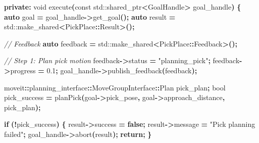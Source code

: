 \documentclass[
]{article}
\newenvironment{Shaded}{\begin{snugshade}}{\end{snugshade}}
\newcommand{\AttributeTok}[1]{\textcolor[rgb]{0.13,0.29,0.53}{#1}}
\newcommand{\BuiltInTok}[1]{#1}
\newcommand{\CommentTok}[1]{\textcolor[rgb]{0.56,0.35,0.01}{\textit{#1}}}
\newcommand{\ControlFlowTok}[1]{\textcolor[rgb]{0.13,0.29,0.53}{\textbf{#1}}}
\newcommand{\DataTypeTok}[1]{\textcolor[rgb]{0.13,0.29,0.53}{#1}}
\newcommand{\FloatTok}[1]{\textcolor[rgb]{0.00,0.00,0.81}{#1}}
\newcommand{\KeywordTok}[1]{\textcolor[rgb]{0.13,0.29,0.53}{\textbf{#1}}}
\newcommand{\NormalTok}[1]{#1}
\newcommand{\OperatorTok}[1]{\textcolor[rgb]{0.81,0.36,0.00}{\textbf{#1}}}
\newcommand{\StringTok}[1]{\textcolor[rgb]{0.31,0.60,0.02}{#1}}
\begin{document}
\begin{Shaded}
\begin{Highlighting}[]
\KeywordTok{private}\OperatorTok{:}
    \DataTypeTok{void}\NormalTok{ execute}\OperatorTok{(}\AttributeTok{const} \BuiltInTok{std::}\NormalTok{shared\_ptr}\OperatorTok{\textless{}}\NormalTok{GoalHandle}\OperatorTok{\textgreater{}}\NormalTok{ goal\_handle}\OperatorTok{)} \OperatorTok{\{}
        \KeywordTok{auto}\NormalTok{ goal }\OperatorTok{=}\NormalTok{ goal\_handle}\OperatorTok{{-}\textgreater{}}\NormalTok{get\_goal}\OperatorTok{();}
        \KeywordTok{auto}\NormalTok{ result }\OperatorTok{=} \BuiltInTok{std::}\NormalTok{make\_shared}\OperatorTok{\textless{}}\NormalTok{PickPlace}\OperatorTok{::}\NormalTok{Result}\OperatorTok{\textgreater{}();}

        \CommentTok{// Feedback}
        \KeywordTok{auto}\NormalTok{ feedback }\OperatorTok{=} \BuiltInTok{std::}\NormalTok{make\_shared}\OperatorTok{\textless{}}\NormalTok{PickPlace}\OperatorTok{::}\NormalTok{Feedback}\OperatorTok{\textgreater{}();}

        \CommentTok{// Step 1: Plan pick motion}
\NormalTok{        feedback}\OperatorTok{{-}\textgreater{}}\NormalTok{status }\OperatorTok{=} \StringTok{"planning\_pick"}\OperatorTok{;}
\NormalTok{        feedback}\OperatorTok{{-}\textgreater{}}\NormalTok{progress }\OperatorTok{=} \FloatTok{0.1}\OperatorTok{;}
\NormalTok{        goal\_handle}\OperatorTok{{-}\textgreater{}}\NormalTok{publish\_feedback}\OperatorTok{(}\NormalTok{feedback}\OperatorTok{);}

\NormalTok{        moveit}\OperatorTok{::}\NormalTok{planning\_interface}\OperatorTok{::}\NormalTok{MoveGroupInterface}\OperatorTok{::}\NormalTok{Plan pick\_plan}\OperatorTok{;}
        \DataTypeTok{bool}\NormalTok{ pick\_success }\OperatorTok{=}\NormalTok{ planPick}\OperatorTok{(}\NormalTok{goal}\OperatorTok{{-}\textgreater{}}\NormalTok{pick\_pose}\OperatorTok{,}\NormalTok{ goal}\OperatorTok{{-}\textgreater{}}\NormalTok{approach\_distance}\OperatorTok{,}\NormalTok{ pick\_plan}\OperatorTok{);}

        \ControlFlowTok{if} \OperatorTok{(!}\NormalTok{pick\_success}\OperatorTok{)} \OperatorTok{\{}
\NormalTok{            result}\OperatorTok{{-}\textgreater{}}\NormalTok{success }\OperatorTok{=} \KeywordTok{false}\OperatorTok{;}
\NormalTok{            result}\OperatorTok{{-}\textgreater{}}\NormalTok{message }\OperatorTok{=} \StringTok{"Pick planning failed"}\OperatorTok{;}
\NormalTok{            goal\_handle}\OperatorTok{{-}\textgreater{}}\NormalTok{abort}\OperatorTok{(}\NormalTok{result}\OperatorTok{);}
            \ControlFlowTok{return}\OperatorTok{;}
        \OperatorTok{\}}


\end{Highlighting}
\end{Shaded}
\end{document}
